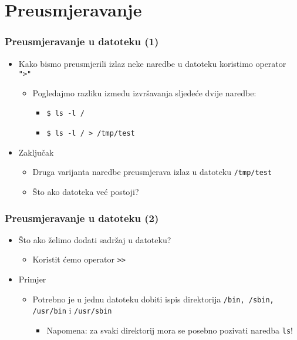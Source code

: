 \documentclass{beamer}
\newcommand{\shell}[1]{\texttt{#1}}
\begin{document}
\section{Preusmjeravanje}
\begin{frame}[t]
\frametitle{Preusmjeravanje u datoteku (1)}
\begin{itemize}
  \item Kako bismo preusmjerili izlaz neke naredbe u datoteku koristimo
        operator \shell{">"}
  \begin{itemize}
    \item Pogledajmo razliku između izvršavanja sljedeće dvije naredbe:
    \begin{itemize}
      \item[] \shell{\$ ls -l /}
      \item[] \shell{\$ ls -l / > /tmp/test}
    \end{itemize}
  \end{itemize}
  \item Zaključak
  \begin{itemize}
    \item Druga varijanta naredbe preusmjerava izlaz u datoteku
          \shell{/tmp/test}
    \item Što ako datoteka već postoji?
  \end{itemize}
\end{itemize}
\end{frame}

\begin{frame}[t]
\frametitle{Preusmjeravanje u datoteku (2)}
\begin{itemize}
  \item Što ako želimo dodati sadržaj u datoteku?
  \begin{itemize}
    \item Koristit ćemo operator \shell{>>}
  \end{itemize}
  \item Primjer
  \begin{itemize}
    \item Potrebno je u jednu datoteku dobiti ispis direktorija
          \shell{/bin, /sbin, /usr/bin} i \shell{/usr/sbin}
    \begin{itemize}
      \item Napomena: za svaki direktorij mora se posebno pozivati
              naredba \shell{ls}!
    \end{itemize}
  \end{itemize}
\end{itemize}
\end{frame}
\end{document}
